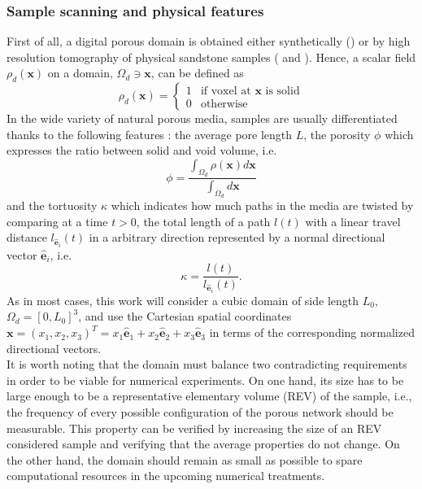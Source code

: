 \subsubsection{Sample scanning and physical features}
First of all, a digital porous domain is obtained either synthetically (\cite{Dentz2017}) or by high resolution tomography of physical sandstone samples (\cite{Meyer2016} and \cite{Puyguiraud2019}).
Hence, a scalar field  $\rho_d(\textbf{x})$ on a domain, $\Omega_d\ni\textbf{x}$, can be defined as 
\[
\rho_d(\textbf{x})=\left\{
\begin{array}{ll}
1 &  \textrm{if voxel at $\textbf{x}$ is solid} \\
0 & \textrm{otherwise}
\end{array} 
\right.
\]
In the wide variety of natural porous media, samples are usually differentiated thanks to the following features : the average pore length $L$, the porosity $\phi$ which expresses the ratio between solid and void volume, i.e.
\[
\phi = \frac{\int_{\Omega_d}\rho(\textbf{x})d\textbf{x}}{\int_{\Omega_d}d\textbf{x}}
\] 
and the tortuosity $\kappa$ which indicates how much paths in the media are twisted by comparing at a time $t>0$, the total length of a path $l(t)$ with a linear travel distance $l_{\hat{\textbf{e}}_i}(t)$ in a arbitrary direction represented by a normal directional vector $\hat{\textbf{e}}_i$, i.e. 
\[
\kappa = \frac{l(t)}{l_{\hat{\textbf{e}}_i}(t)}.
\] 
As in most cases, this work will consider a cubic domain of side length $L_0$, $\Omega_d=[0,L_0]^3$, and use the Cartesian spatial coordinates $\textbf{x}=(x_1,x_2,x_3)^T=x_1\hat{\textbf{e}}_1+x_2\hat{\textbf{e}}_2+x_3\hat{\textbf{e}}_3$ in terms of the corresponding normalized directional vectors.\\
It is worth noting that the domain must balance two contradicting requirements in order to be viable for numerical experiments. 
On one hand, its size has to be large enough to be a representative elementary volume (REV) of the sample, i.e., the frequency of every possible configuration of the porous network should be measurable.
This property can be verified by increasing the size of an REV considered sample and verifying that the average properties do not change.
On the other hand, the domain should remain as small as possible to spare computational resources in the upcoming numerical treatments.\\

